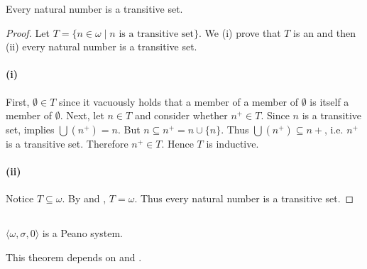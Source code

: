 \documentclass{report}
\begin{document}
  \begin{theorem}[4F]
    Every natural number is a transitive set.
  \end{theorem}

  \begin{proof}

    Let $T = \{n \in \omega \mid n \text{ is a transitive set}\}$.
    We (i) prove that $T$ is an  and then (ii) every
      natural number is a transitive set.

    \paragraph{(i)}%

      First, $\emptyset \in T$ since it vacuously holds that a member of a
        member of $\emptyset$ is itself a member of $\emptyset$.
      Next, let $n \in T$ and consider whether $n^+ \in T$.
      Since $n$ is a transitive set,  implies
        $\bigcup \left(n^+\right) = n$.
      But $n \subseteq n^+ = n \cup \{n\}$.
      Thus $\bigcup \left(n^+\right) \subseteq n+$, i.e. $n^+$ is a transitive
        set.
      Therefore $n^+ \in T$.
      Hence $T$ is inductive.

    \paragraph{(ii)}%

      Notice $T \subseteq \omega$.
      By  and , $T = \omega$.
      Thus every natural number is a transitive set.

  \end{proof}

\subsection{}%

  \begin{theorem}[4D]
    $\langle \omega, \sigma, 0 \rangle$ is a Peano system.
  \end{theorem}


  \begin{note}
    This theorem depends on  and
      .
  \end{note}
\end{document}
